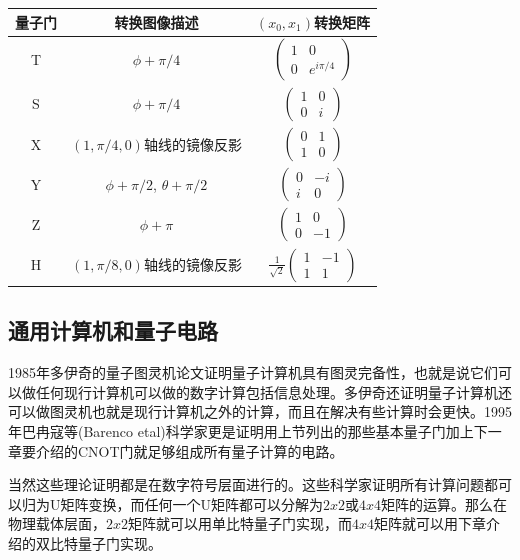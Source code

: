 \documentclass{ctexbook}
\begin{document}
\begin{table}[]
\label{t-gates}
\begin{tabular}{|c|c|c|}
\hline
量子门 & 转换图像描述 & $(x_0, x_1)$转换矩阵 \\
\hline
T & $\phi + \pi/4$ & $
\begin{pmatrix}
    1 & 0 \\
    0 & e^{i \pi/4}
\end{pmatrix} $ \\
\hline
S & $\phi + \pi/4$ & $
\begin{pmatrix}
    1 & 0 \\
    0 & i 
\end{pmatrix} $ \\
\hline
X & $(1, \pi/4, 0)$轴线的镜像反影 & $
\begin{pmatrix}
    0 & 1 \\
    1 & 0
\end{pmatrix} $ \\
\hline
Y & $\phi + \pi/2$, $\theta + \pi/2$ & $
\begin{pmatrix}
    0 & -i \\
    i & 0
\end{pmatrix} $ \\
\hline
Z & $\phi + \pi$ & $
\begin{pmatrix}
    1 & 0 \\
    0 & -1
\end{pmatrix} $ \\
\hline
H & $(1, \pi/8, 0)$轴线的镜像反影  & $
\frac 1 {\sqrt 2}
\begin{pmatrix}
    1 & -1 \\
    1 & 1
\end{pmatrix} $ \\
\hline

\end{tabular}
\end{table}

\subsection{通用计算机和量子电路}
1985年多伊奇的量子图灵机论文证明量子计算机具有图灵完备性，也就是说它们可以做任何现行计算机可以做的数字计算包括信息处理。多伊奇还证明量子计算机还可以做图灵机也就是现行计算机之外的计算，而且在解决有些计算时会更快。1995年巴冉寇等(Barenco etal)科学家更是证明用上节列出的那些基本量子门加上下一章要介绍的CNOT门就足够组成所有量子计算的电路。

当然这些理论证明都是在数字符号层面进行的。这些科学家证明所有计算问题都可以归为U矩阵变换，而任何一个U矩阵都可以分解为$2x2$或$4x4$矩阵的运算。那么在物理载体层面，$2x2$矩阵就可以用单比特量子门实现，而$4x4$矩阵就可以用下章介绍的双比特量子门实现。
\end{document}
